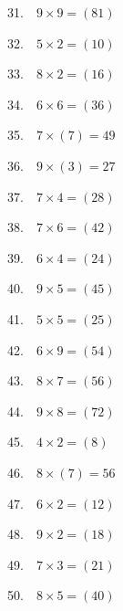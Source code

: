 \documentclass[a4paper]{extarticle}
\begin{document}
\begin{multicols}{3}
31. \,\, $9 \times 9 = (81)$

32. \,\, $5 \times 2 = (10)$

33. \,\, $8 \times 2 = (16)$

\columnbreak

34. \,\, $6 \times 6 = (36)$

35. \,\, $7 \times (7) = 49$

36. \,\, $9 \times (3) = 27$

37. \,\, $7 \times 4 = (28)$

38. \,\, $7 \times 6 = (42)$

39. \,\, $6 \times 4 = (24)$

40. \,\, $9 \times 5 = (45)$

41. \,\, $5 \times 5 = (25)$

42. \,\, $6 \times 9 = (54)$

43. \,\, $8 \times 7 = (56)$

44. \,\, $9 \times 8 = (72)$

45. \,\, $4 \times 2 = (8)$

46. \,\, $8 \times (7) = 56$

47. \,\, $6 \times 2 = (12)$

48. \,\, $9 \times 2 = (18)$

49. \,\, $7 \times 3 = (21)$

50. \,\, $8 \times 5 = (40)$

\end{multicols}
\end{document}
